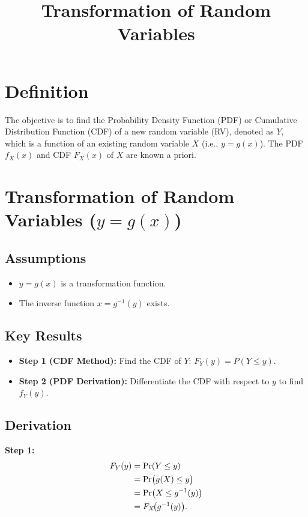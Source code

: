 \documentclass{article}
\title{Transformation of Random Variables}
\author{}
\date{}
\begin{document}
\maketitle

\section*{Definition}

The objective is to find the Probability Density Function (PDF) or Cumulative 
Distribution Function (CDF) of a new random variable (RV), denoted as $Y$, 
which is a function of an existing random variable $X$ (i.e., $y = g(x)$). 
The PDF $f_X(x)$ and CDF $F_X(x)$ of $X$ are known a priori.

\section{Transformation of Random Variables ($y = g(x)$)}

\subsection*{Assumptions}
\begin{itemize}
    \item $y = g(x)$ is a transformation function.
    \item The inverse function $x = g^{-1}(y)$ exists.
\end{itemize}

\subsection*{Key Results}
\begin{itemize}
    \item \textbf{Step 1 (CDF Method):} Find the CDF of $Y$: 
          $F_Y(y) = P(Y \leq y)$.
    \item \textbf{Step 2 (PDF Derivation):} Differentiate the CDF with respect 
          to $y$ to find $f_Y(y)$.
\end{itemize}

\subsection*{Derivation}

\textbf{Step 1:}
\begin{align}
    F_Y(y) &= \Pr(Y \leq y) \notag \\
           &= \Pr\bigl(g(X) \leq y\bigr) \notag \\
           &= \Pr\bigl(X \leq g^{-1}(y)\bigr) \notag \\
           &= F_X\!\bigl(g^{-1}(y)\bigr).
\end{align}
\end{document}
